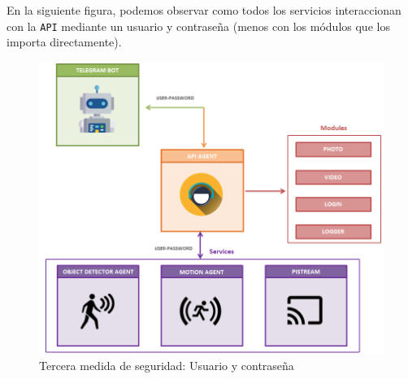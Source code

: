 En la siguiente figura, podemos observar como todos los servicios interaccionan con la \texttt{API} mediante un usuario y contraseña (menos con los módulos que los importa directamente).

\newpage

\begin{figure}[h]
	\centering
	\includegraphics[scale=0.5]{images/38}
	\caption{Tercera medida de seguridad: Usuario y contraseña}
	\label{img:seg3}
\end{figure}

